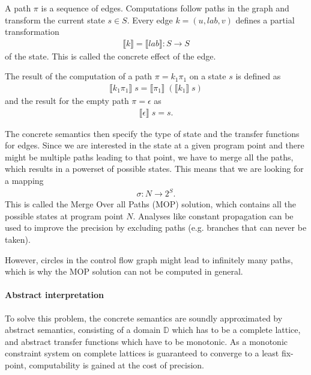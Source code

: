 A path $\pi$ is a sequence of edges.
Computations follow paths in the graph and transform the current state $s \in S$.
Every edge $k = (u, lab, v)$ defines a partial transformation
\begin{align}
\llbracket k \rrbracket = \llbracket lab \rrbracket : S \to S
\end{align}
of the state. This is called the concrete effect of the edge.

The result of the computation of a path $\pi = k_1 \pi_1$ on a state $s$ is defined as
\begin{align}
\llbracket k_1 \pi_1 \rrbracket \; s = \llbracket \pi_1 \rrbracket \; (\llbracket k_1 \rrbracket \; s)
\end{align}
and the result for the empty path $\pi = \epsilon$ as
\begin{align}
\llbracket \epsilon \rrbracket \; s = s.
\end{align}

The concrete semantics then specify the type of state and the transfer functions for edges.
Since we are interested in the state at a given program point and there might be multiple paths leading to that point, we have to merge all the paths, which results in a powerset of possible states. This means that we are looking for a mapping
\begin{align}
\sigma : N \to 2^S.
\end{align}
This is called the Merge Over all Paths (MOP) solution, which contains all the possible states at program point $N$.
Analyses like constant propagation can be used to improve the precision by excluding paths (e.g. branches that can never be taken).

However, circles in the control flow graph might lead to infinitely many paths, which is why the MOP solution can not be computed in general.

\paragraph*{Abstract interpretation}
To solve this problem, the concrete semantics are soundly approximated by abstract semantics, consisting of a domain $\mathbb{D}$ which has to be a complete lattice, and abstract transfer functions which have to be monotonic. As a monotonic constraint system on complete lattices is guaranteed to converge to a least fix-point, computability is gained at the cost of precision.

